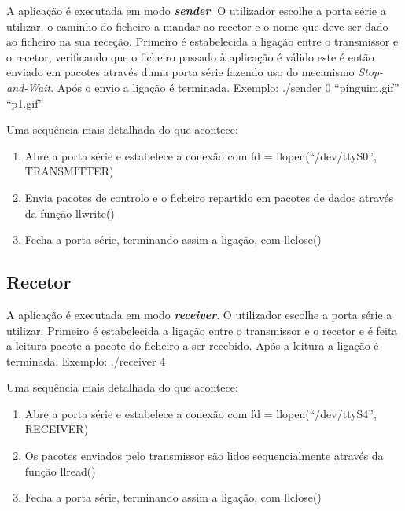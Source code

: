 \documentclass[a4paper,11pt,portuguese]{article}
\begin{document}
        A aplicação é executada em modo \textbf{\textit{sender}}. O utilizador escolhe a porta série a
        utilizar, o caminho do ficheiro a mandar ao recetor e o nome que deve ser dado ao ficheiro
        na sua receção. Primeiro é estabelecida a ligação entre o transmissor e o recetor, verificando
        que o ficheiro passado à aplicação é válido este é então enviado em pacotes através duma porta
        série fazendo uso do mecanismo \textit{Stop-and-Wait}. Após o envio a ligação é terminada.
        Exemplo: \hfill \break
        ./sender 0 ``pinguim.gif'' ``p1.gif''

        \hfill \break
        \noindent Uma sequência mais detalhada do que acontece:
        \begin{enumerate}
            \item Abre a porta série e estabelece a conexão com fd = llopen(``/dev/ttyS0'', TRANSMITTER)
            \item Envia pacotes de controlo e o ficheiro repartido em pacotes de dados através da função llwrite()
            \item Fecha a porta série, terminando assim a ligação, com llclose()
        \end{enumerate}

    \subsection{Recetor}

        A aplicação é executada em modo \textbf{\textit{receiver}}. O utilizador escolhe a porta série a
        utilizar. Primeiro é estabelecida a ligação entre o transmissor e o recetor e é feita a leitura
        pacote a pacote do ficheiro a ser recebido. Após a leitura a ligação é terminada. Exemplo: \hfill \break
        ./receiver 4

        \hfill \break
        \noindent Uma sequência mais detalhada do que acontece:
        \begin{enumerate}
            \item Abre a porta série e estabelece a conexão com fd = llopen(``/dev/ttyS4'', RECEIVER)
            \item Os pacotes enviados pelo transmissor são lidos sequencialmente através da função llread()
            \item Fecha a porta série, terminando assim a ligação, com llclose()
        \end{enumerate}


\end{document}
